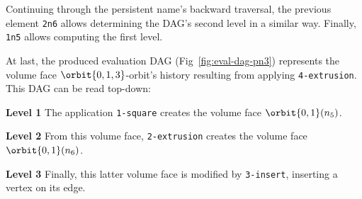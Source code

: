 Continuing through the persistent name's backward traversal, the previous element \texttt{2n6} allows determining the DAG's second level %
in a similar way.
Finally, \texttt{1n5} allows computing the first level.   

At last, the produced evaluation DAG (Fig~\ref{fig:eval-dag-pn3}) represents the volume face $\orbit{0,1,3}$-orbit's history  resulting from applying \texttt{4-extrusion}.
This DAG can be read top-down:

\textbf{Level 1} The application \texttt{1-square} creates the volume face
$\orbit{0,1}(n_5)$.

\textbf{Level 2} From this volume face, \texttt{2-extrusion} creates the volume
face $\orbit{0,1}(n_6)$.

\textbf{Level 3} Finally, this latter volume face is modified by
\texttt{3-insert}, inserting a vertex on its edge.



